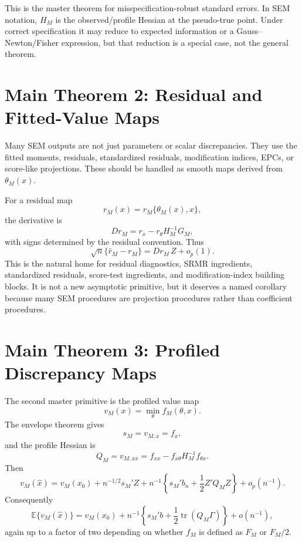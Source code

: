 \documentclass[11pt]{article}
\newcommand{\E}{\mathbb{E}}
\newcommand{\tr}{\operatorname{tr}}
\theoremstyle{plain}
\theoremstyle{remark}
\begin{document}
This is the master theorem for misspecification-robust standard errors. In SEM
notation, $H_M$ is the observed/profile Hessian at the pseudo-true point. Under
correct specification it may reduce to expected information or a
Gauss--Newton/Fisher expression, but that reduction is a special case, not the
general theorem.

\section{Main Theorem 2: Residual and Fitted-Value Maps}

Many SEM outputs are not just parameters or scalar discrepancies. They use the
fitted moments, residuals, standardized residuals, modification indices, EPCs,
or score-like projections. These should be handled as smooth maps derived from
$\theta_M(x)$.

For a residual map
\[
  r_M(x)=r_M\{\theta_M(x),x\},
\]
the derivative is
\begin{equation}\label{eq:resid-derivative}
  Dr_M
  =
  r_x-r_\theta H_M^{-1}G_M ,
\end{equation}
with signs determined by the residual convention. Thus
\[
  \sqrt n\{\hat r_M-r_M\}
  =
  Dr_M\,Z+o_p(1).
\]
This is the natural home for residual diagnostics, SRMR ingredients,
standardized residuals, score-test ingredients, and modification-index
building blocks. It is not a new asymptotic primitive, but it deserves a named
corollary because many SEM procedures are projection procedures rather than
coefficient procedures.

\section{Main Theorem 3: Profiled Discrepancy Maps}

The second master primitive is the profiled value map
\[
  v_M(x)=\min_\theta f_M(\theta,x).
\]
The envelope theorem gives
\[
  s_M=v_{M,x}=f_x ,
\]
and the profile Hessian is
\begin{equation}\label{eq:Q}
  Q_M
  =
  v_{M,xx}
  =
  f_{xx}-f_{x\theta}H_M^{-1}f_{\theta x}.
\end{equation}
Then
\begin{equation}\label{eq:value-expansion}
  v_M(\hat x)
  =
  v_M(x_0)
  +n^{-1/2}s_M'Z
  +n^{-1}\left\{s_M'b_n+\frac12 Z'Q_MZ\right\}
  +o_p(n^{-1}).
\end{equation}
Consequently
\begin{equation}\label{eq:value-bias}
  \E\{v_M(\hat x)\}
  =
  v_M(x_0)
  +n^{-1}\left\{s_M'b+\frac12\tr(Q_M\Gamma)\right\}
  +o(n^{-1}),
\end{equation}
again up to a factor of two depending on whether $f_M$ is defined as $F_M$ or
$F_M/2$.
\end{document}
